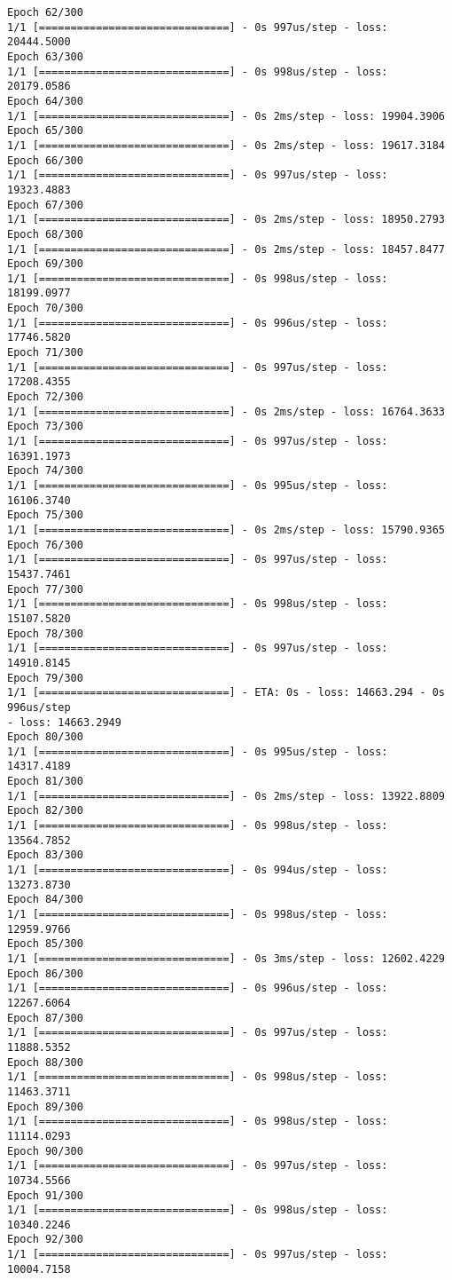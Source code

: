 \documentclass[11pt]{article}
\begin{document}
\begin{Verbatim}[commandchars=\\\{\}]
Epoch 62/300
1/1 [==============================] - 0s 997us/step - loss: 20444.5000
Epoch 63/300
1/1 [==============================] - 0s 998us/step - loss: 20179.0586
Epoch 64/300
1/1 [==============================] - 0s 2ms/step - loss: 19904.3906
Epoch 65/300
1/1 [==============================] - 0s 2ms/step - loss: 19617.3184
Epoch 66/300
1/1 [==============================] - 0s 997us/step - loss: 19323.4883
Epoch 67/300
1/1 [==============================] - 0s 2ms/step - loss: 18950.2793
Epoch 68/300
1/1 [==============================] - 0s 2ms/step - loss: 18457.8477
Epoch 69/300
1/1 [==============================] - 0s 998us/step - loss: 18199.0977
Epoch 70/300
1/1 [==============================] - 0s 996us/step - loss: 17746.5820
Epoch 71/300
1/1 [==============================] - 0s 997us/step - loss: 17208.4355
Epoch 72/300
1/1 [==============================] - 0s 2ms/step - loss: 16764.3633
Epoch 73/300
1/1 [==============================] - 0s 997us/step - loss: 16391.1973
Epoch 74/300
1/1 [==============================] - 0s 995us/step - loss: 16106.3740
Epoch 75/300
1/1 [==============================] - 0s 2ms/step - loss: 15790.9365
Epoch 76/300
1/1 [==============================] - 0s 997us/step - loss: 15437.7461
Epoch 77/300
1/1 [==============================] - 0s 998us/step - loss: 15107.5820
Epoch 78/300
1/1 [==============================] - 0s 997us/step - loss: 14910.8145
Epoch 79/300
1/1 [==============================] - ETA: 0s - loss: 14663.294 - 0s 996us/step
- loss: 14663.2949
Epoch 80/300
1/1 [==============================] - 0s 995us/step - loss: 14317.4189
Epoch 81/300
1/1 [==============================] - 0s 2ms/step - loss: 13922.8809
Epoch 82/300
1/1 [==============================] - 0s 998us/step - loss: 13564.7852
Epoch 83/300
1/1 [==============================] - 0s 994us/step - loss: 13273.8730
Epoch 84/300
1/1 [==============================] - 0s 998us/step - loss: 12959.9766
Epoch 85/300
1/1 [==============================] - 0s 3ms/step - loss: 12602.4229
Epoch 86/300
1/1 [==============================] - 0s 996us/step - loss: 12267.6064
Epoch 87/300
1/1 [==============================] - 0s 997us/step - loss: 11888.5352
Epoch 88/300
1/1 [==============================] - 0s 998us/step - loss: 11463.3711
Epoch 89/300
1/1 [==============================] - 0s 998us/step - loss: 11114.0293
Epoch 90/300
1/1 [==============================] - 0s 997us/step - loss: 10734.5566
Epoch 91/300
1/1 [==============================] - 0s 998us/step - loss: 10340.2246
Epoch 92/300
1/1 [==============================] - 0s 997us/step - loss: 10004.7158

\end{Verbatim}
\end{document}
